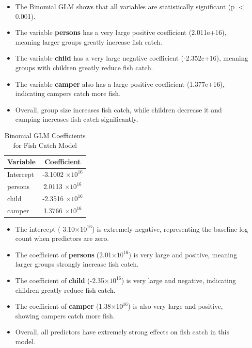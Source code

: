 \documentclass[12pt,a4paper]{report}
\begin{document}
\begin{tcolorbox}[colback=blue!5!white,colframe=blue!70!black,title=Interpretation]
\begin{itemize}
    \item The Binomial GLM shows that all variables are statistically significant (p $<$ 0.001).
    \item The variable \textbf{persons} has a very large positive coefficient (2.011e+16), meaning larger groups greatly increase fish catch.
    \item The variable \textbf{child} has a very large negative coefficient (-2.352e+16), meaning groups with children greatly reduce fish catch.
    \item The variable \textbf{camper} also has a large positive coefficient (1.377e+16), indicating campers catch more fish.
    \item Overall, group size increases fish catch, while children decrease it and camping increases fish catch significantly.
\end{itemize}
\end{tcolorbox}
\begin{table}[h!]
\centering
\begin{tabular}{|l|c|}
\hline
\textbf{Variable} & \textbf{Coefficient} \\ \hline
Intercept & -3.1002 $\times 10^{16}$ \\ \hline
persons   &  2.0113 $\times 10^{16}$ \\ \hline
child     & -2.3516 $\times 10^{16}$ \\ \hline
camper    &  1.3766 $\times 10^{16}$ \\ \hline
\end{tabular}
\caption{Binomial GLM Coefficients for Fish Catch Model}
\label{tab:binomial_glm_coef}
\end{table}

\begin{tcolorbox}[colback=blue!5!white,colframe=blue!70!black,title=Interpretation]
\begin{itemize}
    \item The intercept (-3.10$\times 10^{16}$) is extremely negative, representing the baseline log count when predictors are zero.
    \item The coefficient of \textbf{persons} (2.01$\times 10^{16}$) is very large and positive, meaning larger groups strongly increase fish catch.
    \item The coefficient of \textbf{child} (-2.35$\times 10^{16}$) is very large and negative, indicating children greatly reduce fish catch.
    \item The coefficient of \textbf{camper} (1.38$\times 10^{16}$) is also very large and positive, showing campers catch more fish.
    \item Overall, all predictors have extremely strong effects on fish catch in this model.
\end{itemize}
\end{tcolorbox}
\clearpage
\end{document}
